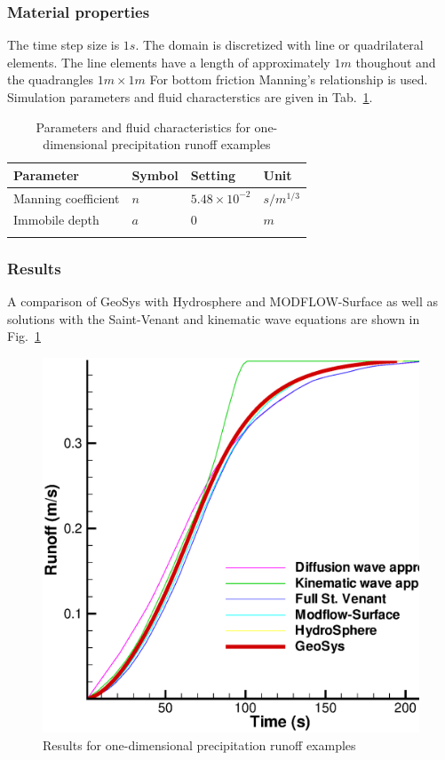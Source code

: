 \subsubsection*{Material properties}
%
The time step size is $1 s$.
The domain is discretized with line or quadrilateral elements.
The line elements have a length of approximately $1m$ thoughout and the quadrangles $1m\times 1m$
For bottom friction Manning's relationship is used.
Simulation parameters and fluid characterstics are given in Tab.~\ref{OLF:govindarajuSetting}.
%
\begin{table}[H]
 \centering
 \caption{Parameters and fluid characteristics for one-dimensional precipitation runoff examples}
 \centering \label{OLF:govindarajuSetting}
 \begin{tabular}{llll}
 \hline\hline\noalign{\smallskip}
 {\bf Parameter} & {\bf Symbol} & {\bf Setting} & {\bf Unit} \\ \hline
 Manning coefficient & $n$  & $5.48\times 10^{-2}$ & $s/m^{1/3}$\\
 Immobile depth & $a$ & $0$ & $m$ \\
\noalign{\smallskip}\hline\hline
 \end{tabular}
\end{table}
%
\subsubsection*{Results}
%
A comparison of GeoSys with Hydrosphere and MODFLOW-Surface as well as solutions with the Saint-Venant and kinematic wave equations are shown in Fig.~\ref{OLF:govin_outlet}
%
\begin{figure} [htb!]
 \centering
 \includegraphics[width=0.75\columnwidth] {H_SFC/figures/govin.eps}
 \caption{Results for one-dimensional precipitation runoff examples}
 \label{OLF:govin_outlet}
\end{figure}
%
